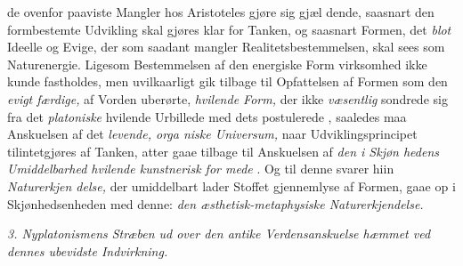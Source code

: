 de ovenfor paaviste Mangler hos Aristoteles gjøre sig gjæl\-%
dende, saasnart den formbestemte Udvikling skal gjøres klar
for Tanken, og saasnart Formen, det \emph{blot} Ideelle og Evige,
der som saadant mangler Realitetsbestemmelsen, skal sees som
Naturenergie. Ligesom Bestemmelsen af den energiske Form\-%
virksomhed ikke kunde fastholdes, men uvilkaarligt gik tilbage
til Opfattelsen af Formen som den \emph{evigt færdige,} af Vorden
uberørte, \emph{hvilende Form,} der ikke \emph{væsentlig} sondrede sig
fra det \emph{platoniske} hvilende Urbillede med dets postulerede
, saaledes maa Anskuelsen af det \emph{levende, orga\-%
niske Universum,} naar Udviklingsprincipet tilintetgjøres af
Tanken, atter gaae tilbage til Anskuelsen af \emph{den i Skjøn\-%
hedens Umiddelbarhed hvilende kunstnerisk for\-%
mede }. Og til denne svarer hiin \emph{Naturerkjen\-%
delse,} der umiddelbart lader Stoffet gjennemlyse af Formen,
gaae op i Skjønhedsenheden med denne: \emph{den æsthetisk-metaphysiske Naturerkjendelse.}

\divrule

\emph{3. Nyplatonismens Stræben ud over den antike
Verdensanskuelse hæmmet ved dennes ubevidste
Indvirkning.}

